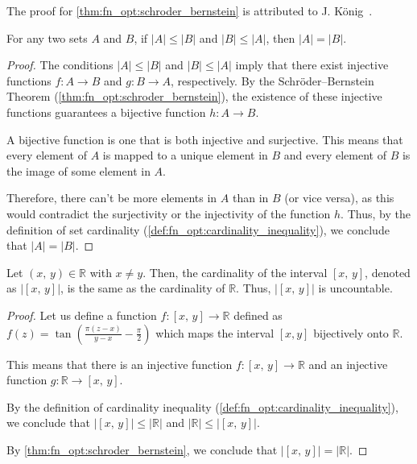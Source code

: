     The proof for \vref{thm:fn_opt:schroder_bernstein} is attributed to J.
    König~\autocite{konigTheorieEnsembles1906}.

    \begin{corollary}
    \label{cor:fn_opt:cardinality}
      For any two sets \(A\) and \(B\), if \(|A| \leq |B|\) and \(|B| \leq 
      |A|\), then \(|A| = |B|\).
    \end{corollary}

    \begin{proof}
      The conditions \(|A| \leq |B|\) and \(|B| \leq |A|\) imply that there
      exist injective functions \(f: A \rightarrow B\) and \(g: B
      \rightarrow A\), respectively.
      By the Schröder--Bernstein Theorem (\vref{thm:fn_opt:schroder_bernstein}),
      the existence of these injective functions guarantees a bijective function
      \(h: A \rightarrow B\).

      A bijective function is one that is both injective and surjective.
      This means that every element of \(A\) is mapped to a unique element in
      \(B\) and every element of \(B\) is the image of some element in \(A\).

      Therefore, there can't be more elements in \(A\) than in \(B\) (or vice
      versa), as this would contradict the surjectivity or the injectivity of
      the function \(h\).
      Thus, by the definition of set cardinality
      (\vref{def:fn_opt:cardinality_inequality}), we conclude that \(|A| =
      |B|\).
    \end{proof}

    \begin{theorem}
    \label{thm:fn_opt:cardinality}
      Let $(x,\,y) \in \mathbb{R}$ with $x \neq y$.
      Then, the cardinality of the interval $[x,\,y]$, denoted as $|[x,\,y]|$,
      is the same as the cardinality of \(\mathbb{R}\).
      Thus, $|[x,\,y]|$ is uncountable.
    \end{theorem}

    \begin{proof}
      Let us define a function \(f: [x,\,y] \rightarrow \mathbb{R}\) defined 
      as \(f(z) = \tan\left(\frac{\pi(z-x)}{y-x} - \frac{\pi}{2}\right)\) 
      which maps the interval \([x, y]\) bijectively onto \(\mathbb{R}\).
      
      This means that there is an injective function \(f: [x,\,y] \rightarrow
      \mathbb{R}\) and an injective function \(g: \mathbb{R} \rightarrow
      [x,\,y]\).

      By the definition of cardinality inequality
      (\vref{def:fn_opt:cardinality_inequality}), we conclude that
      \(|[x,\,y]| \leq |\mathbb{R}|\) and \(|\mathbb{R}| \leq |[x,\,y]|\).

      By \vref{thm:fn_opt:schroder_bernstein}, we conclude that
      \(|[x,\,y]| = |\mathbb{R}|\).
    \end{proof}    


